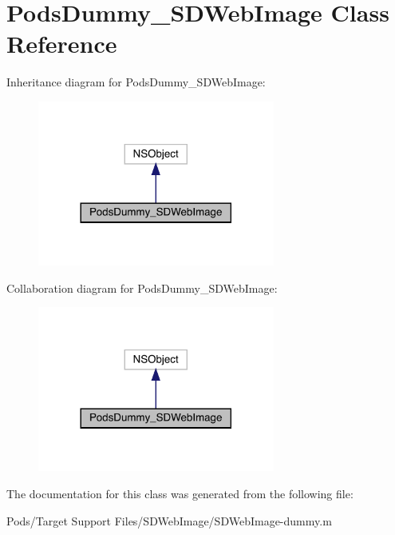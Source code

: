 \hypertarget{interface_pods_dummy___s_d_web_image}{}\section{Pods\+Dummy\+\_\+\+S\+D\+Web\+Image Class Reference}
\label{interface_pods_dummy___s_d_web_image}


Inheritance diagram for Pods\+Dummy\+\_\+\+S\+D\+Web\+Image\+:\nopagebreak
\begin{figure}[H]
\begin{center}
\leavevmode
\includegraphics[width=221pt]{interface_pods_dummy___s_d_web_image__inherit__graph}
\end{center}
\end{figure}


Collaboration diagram for Pods\+Dummy\+\_\+\+S\+D\+Web\+Image\+:\nopagebreak
\begin{figure}[H]
\begin{center}
\leavevmode
\includegraphics[width=221pt]{interface_pods_dummy___s_d_web_image__coll__graph}
\end{center}
\end{figure}


The documentation for this class was generated from the following file\+:\begin{DoxyCompactItemize}
\item 
Pods/\+Target Support Files/\+S\+D\+Web\+Image/S\+D\+Web\+Image-\/dummy.\+m\end{DoxyCompactItemize}
